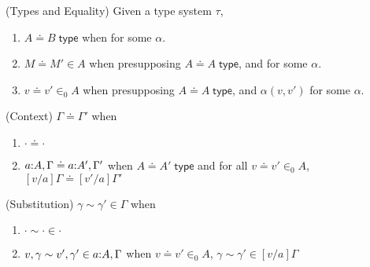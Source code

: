 \newcommand{\eqType}[2]{\ensuremath{#1 \doteq #2\; \mathsf{type}}}
\newcommand{\eqComp}[3]{\ensuremath{#1 \doteq #2 \in #3}}
\newcommand{\eqVal}[3]{\ensuremath{#1 \doteq #2 \in_0 #3}}

\newcommand{\openEqComp}[4]{\ensuremath{#1 \gg #2 \doteq #3 \in #4}}
\newcommand{\openEqVal}[4]{\ensuremath{#1 \gg #2 \doteq #3 \in_0 #4}}
\newcommand{\openComp}[3]{\ensuremath{#1 \gg #2 \in #3}}
\newcommand{\openTypeComp}[2]{\ensuremath{#1 \gg #2 \; \mathsf{type}}}
\newcommand{\openEqTypeComp}[3]{\ensuremath{#1 \gg #2 \doteq  #3 \; \mathsf{type}}}

\newcommand{\eqCtx}[2]{\ensuremath{#1 \doteq #2}}
\newcommand{\eqInst}[3]{\ensuremath{#1 \sim #2 \in #3}}

\begin{definition}(Types and Equality)
  Given a type system $\tau$, 
  \begin{enumerate}
    \item \eqType{A}{B} when  for some $\alpha$.
    \item \eqComp{M}{M'}{A} when presupposing \eqType{A}{A},
       and  for some $\alpha$.
    \item \eqVal{v}{v'}{A} when presupposing \eqType{A}{A},
       and $\alpha(v,v')$ for some $\alpha$.
  \end{enumerate}
\end{definition}

\begin{definition}(Context)
  \eqCtx{\Gamma}{\Gamma'} when
  \begin{enumerate}
    \item \eqCtx{\cdot}{\cdot}
    \item \eqCtx{\isOf{a}{A},\Gamma}{\isOf{a}{A'},\Gamma'} when \eqType{A}{A'} and for all 
      \eqVal{v}{v'}{A}, \eqCtx{[v/a]\Gamma}{[v'/a]\Gamma'}
  \end{enumerate}
\end{definition}

\begin{definition}(Substitution)
  \eqInst{\gamma}{\gamma'}{\Gamma} when
  \begin{enumerate}
    \item \eqInst{\cdot}{\cdot}{\cdot}
    \item \eqInst{v,\gamma}{v',\gamma'}{\isOf{a}{A},\Gamma} when
      \eqVal{v}{v'}{A}, \eqInst{\gamma}{\gamma'}{[v/a]\Gamma}
  \end{enumerate}
\end{definition}

